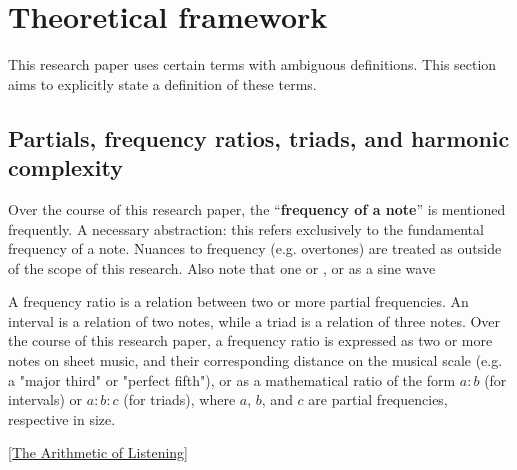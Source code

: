 \section{Theoretical framework}
This research paper uses certain terms with ambiguous definitions. This section aims to explicitly state a definition of these terms.

\subsection{Partials, frequency ratios, triads, and harmonic complexity}

Over the course of this research paper, the ``\textbf{frequency of a note}'' is mentioned frequently. A necessary abstraction: this refers exclusively to the fundamental frequency of a note. Nuances to frequency (e.g. overtones) are treated as outside of the scope of this research. Also note that one or , or as a sine wave

\begin{figure}
\end{figure}

A frequency ratio is a relation between two or more partial frequencies. An interval is a relation of two notes, while a triad is a relation of three notes. Over the course of this research paper, a frequency ratio is expressed as two or more notes on sheet music, and their corresponding distance on the musical scale (e.g. a "major third" or "perfect fifth"), or as a mathematical ratio of the form $a : b$ (for intervals) or $a : b : c$ (for triads), where $a$, $b$, and $c$ are partial frequencies, respective in size. 

\ref{The Arithmetic of Listening}


%